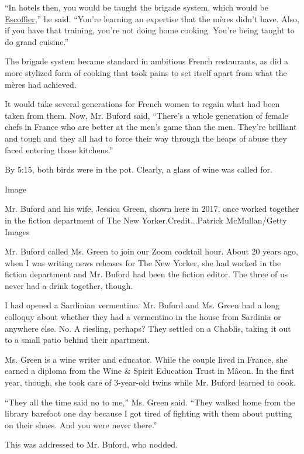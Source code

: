 ``In hotels then, you would be taught the brigade system, which would be
\href{https://www.nytimes3xbfgragh.onion/1961/04/16/archives/chef-of-chefs-he-was-escoffier-the-most-renowned-man-ever-to-wear-a.html}{Escoffier},''
he said. ``You're learning an expertise that the mères didn't have.
Also, if you have that training, you're not doing home cooking. You're
being taught to do grand cuisine.''

The brigade system became standard in ambitious French restaurants, as
did a more stylized form of cooking that took pains to set itself apart
from what the mères had achieved.

It would take several generations for French women to regain what had
been taken from them. Now, Mr. Buford said, ``There's a whole generation
of female chefs in France who are better at the men's game than the men.
They're brilliant and tough and they all had to force their way through
the heaps of abuse they faced entering those kitchens.''

By 5:15, both birds were in the pot. Clearly, a glass of wine was called
for.

Image

Mr. Buford and his wife, Jessica Green, shown here in 2017, once worked
together in the fiction department of The New Yorker.Credit...Patrick
McMullan/Getty Images

Mr. Buford called Ms. Green to join our Zoom cocktail hour. About 20
years ago, when I was writing news releases for The New Yorker, she had
worked in the fiction department and Mr. Buford had been the fiction
editor. The three of us never had a drink together, though.

I had opened a Sardinian vermentino. Mr. Buford and Ms. Green had a long
colloquy about whether they had a vermentino in the house from Sardinia
or anywhere else. No. A riesling, perhaps? They settled on a Chablis,
taking it out to a small patio behind their apartment.

Ms. Green is a wine writer and educator. While the couple lived in
France, she earned a diploma from the Wine \& Spirit Education Trust in
Mâcon. In the first year, though, she took care of 3-year-old twins
while Mr. Buford learned to cook.

``They all the time said no to me,'' Ms. Green said. ``They walked home
from the library barefoot one day because I got tired of fighting with
them about putting on their shoes. And you were never there.''

This was addressed to Mr. Buford, who nodded.

